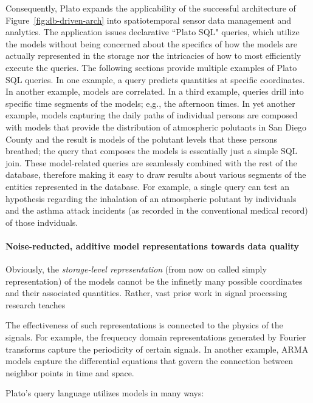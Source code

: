 {%

Consequently, Plato expands the applicability of the successful architecture of Figure~\ref{fig:db-driven-arch} into spatiotemporal sensor data management and analytics. The application issues declarative ``Plato SQL" queries, which utilize the models without being concerned about the specifics of how the models are actually represented in the storage nor the intricacies of how to most efficiently execute the queries. The following sections provide multiple examples of Plato SQL queries. In one example, a query predicts quantities at specific coordinates. In another example, models are correlated. In a third example, queries drill into specific time segments of the models; e,g., the afternoon times. In yet another example, models capturing the daily paths of individual persons are composed with models that provide the distribution of atmospheric polutants in San Diego County and the result is models of the polutant levels that these persons breathed; the query that composes the models is essentially just a simple SQL join. These model-related queries are seamlessly combined with the rest of the database, therefore making it easy to draw results about various segments of the entities represented in the database. For example, a single query can test an hypothesis regarding the inhalation of an atmospheric polutant by individuals and the asthma attack incidents (as recorded in the conventional medical record) of those indviduals.


\paragraph{Noise-reducted, additive model representations towards data quality}
Obviously, the {\em storage-level representation} (from now on called simply representation) of the models cannot be the infinetly many possible coordinates and their associated quantities. Rather, vast prior work in signal processing research teaches 

The effectiveness of such representations is connected to the physics of the signals. For example, the frequency domain representations generated by Fourier transforms capture the periodicity of certain signals. In another example, ARMA models capture the differential equations that govern the connection between neighbor points in time and space.

Plato's query language utilizes models in many ways: 

}
